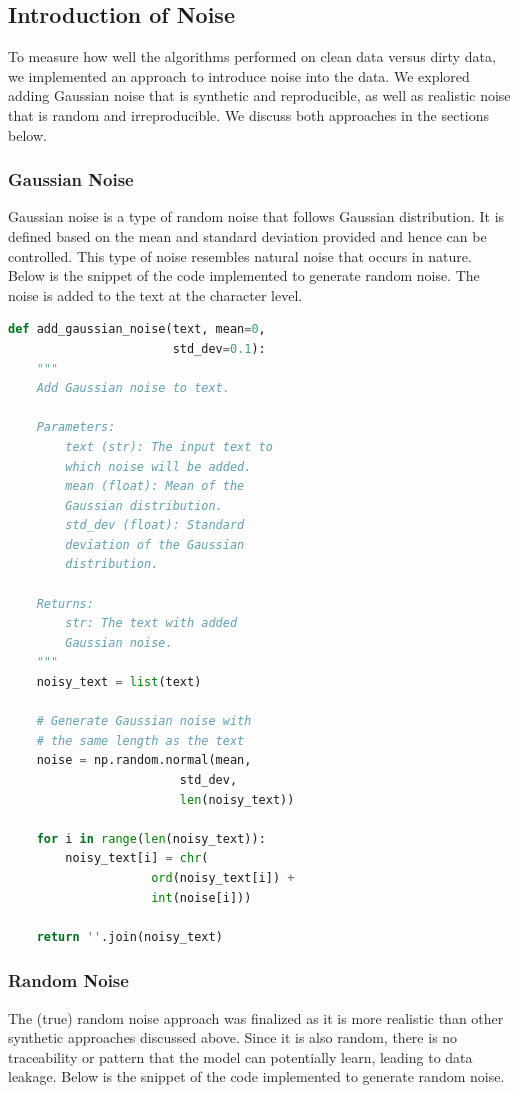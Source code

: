 \documentclass{article}
\begin{document}
\subsection{Introduction of Noise}
To measure how well the algorithms performed on clean data versus dirty data, we implemented an approach to introduce noise into the data. We explored adding Gaussian noise that is synthetic and reproducible, as well as realistic noise that is random and irreproducible. We discuss both approaches in the sections below.
\subsubsection{Gaussian Noise}
Gaussian noise is a type of random noise that follows Gaussian distribution. It is defined based on the mean and standard deviation provided and hence can be controlled. This type of noise resembles natural noise that occurs in nature. Below is the snippet of the code implemented to generate random noise. The noise is added to the text at the character level. 

\begin{lstlisting}[language=Python, caption=Gaussian Noise]
def add_gaussian_noise(text, mean=0, 
                       std_dev=0.1):
    """
    Add Gaussian noise to text.
    
    Parameters:
        text (str): The input text to 
        which noise will be added.
        mean (float): Mean of the 
        Gaussian distribution.
        std_dev (float): Standard 
        deviation of the Gaussian 
        distribution.
    
    Returns:
        str: The text with added 
        Gaussian noise.
    """
    noisy_text = list(text)
    
    # Generate Gaussian noise with 
    # the same length as the text
    noise = np.random.normal(mean, 
                        std_dev, 
                        len(noisy_text))
    
    for i in range(len(noisy_text)):
        noisy_text[i] = chr(
                    ord(noisy_text[i]) + 
                    int(noise[i]))
    
    return ''.join(noisy_text)
\end{lstlisting}

\subsubsection{Random Noise}
The (true) random noise approach was finalized as it is more realistic than other synthetic approaches discussed above. Since it is also random, there is no traceability or pattern that the model can potentially learn, leading to data leakage. Below is the snippet of the code implemented to generate random noise. 
\end{document}
